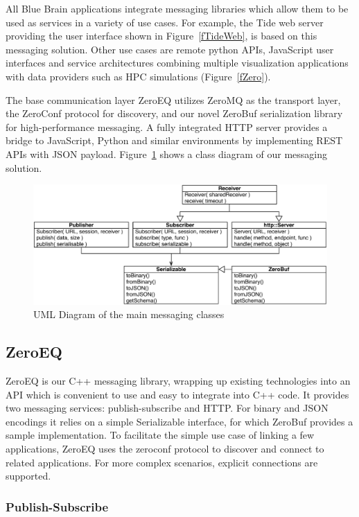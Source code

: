 \documentclass[10pt]{llncs}
\newcommand{\fig}[1]{Figure~\ref{#1}}
\begin{document}
All Blue Brain applications integrate messaging libraries which allow them to be
used as services in a variety of use cases. For example, the Tide web server
providing the user interface shown in \fig{fTideWeb}, is based on this messaging
solution. Other use cases are remote python APIs, JavaScript user interfaces and
service architectures combining multiple visualization applications with data
providers such as HPC simulations (\fig{fZero}).

The base communication layer ZeroEQ utilizes ZeroMQ as the transport layer, the
ZeroConf protocol for discovery, and our novel ZeroBuf serialization library for
high-performance messaging. A fully integrated HTTP server provides a bridge to
JavaScript, Python and similar environments by implementing REST APIs with JSON
payload. \fig{fUML} shows a class diagram of our messaging solution.

\begin{figure}[ht]\center
  \includegraphics[width=\columnwidth]{images/ZeroMSUML}
  \caption{\label{fUML}UML Diagram of the main messaging classes}
\end{figure}

\subsection{ZeroEQ}

ZeroEQ is our C++ messaging library, wrapping up existing technologies into an
API which is convenient to use and easy to integrate into C++ code. It provides
two messaging services: publish-subscribe and HTTP. For binary and JSON
encodings it relies on a simple \textsf{Serializable} interface, for which
ZeroBuf provides a sample implementation. To facilitate the simple use case of
linking a few applications, ZeroEQ uses the zeroconf protocol to discover and
connect to related applications. For more complex scenarios, explicit
connections are supported.

\subsubsection{Publish-Subscribe}
\end{document}
